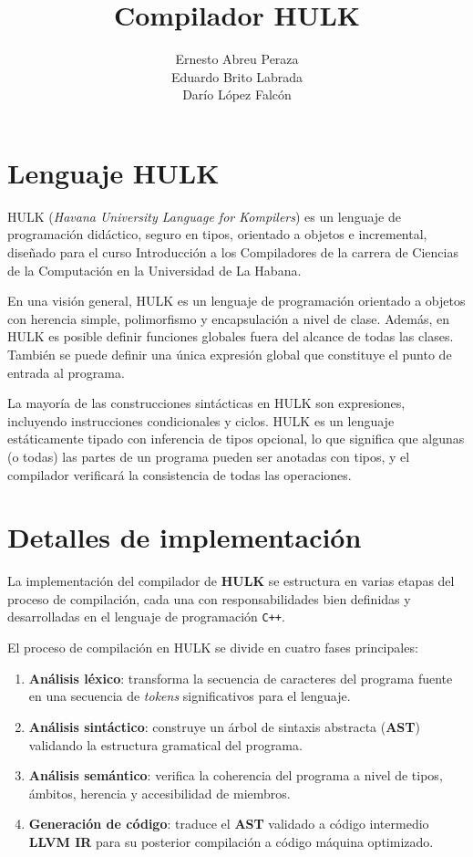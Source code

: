 \documentclass{article}
\title{Compilador HULK}
\author{Ernesto Abreu Peraza \\ Eduardo Brito Labrada \\ Darío López Falcón}
\date{}
\begin{document}
\maketitle 

\section{Lenguaje HULK}

HULK (\textit{Havana University Language for Kompilers}) es un lenguaje de programación didáctico, seguro en tipos, orientado a objetos e incremental, diseñado para el curso Introducción a los Compiladores de la carrera de Ciencias de la Computación en la Universidad de La Habana.

En una visión general, HULK es un lenguaje de programación orientado a objetos con herencia simple, polimorfismo y encapsulación a nivel de clase. Además, en HULK es posible definir funciones globales fuera del alcance de todas las clases. También se puede definir una única expresión global que constituye el punto de entrada al programa.

La mayoría de las construcciones sintácticas en HULK son expresiones, incluyendo instrucciones condicionales y ciclos. HULK es un lenguaje estáticamente tipado con inferencia de tipos opcional, lo que significa que algunas (o todas) las partes de un programa pueden ser anotadas con tipos, y el compilador verificará la consistencia de todas las operaciones.

\section{Detalles de implementación}

La implementación del compilador de \textbf{HULK} se estructura en varias etapas del proceso de compilación, cada una con responsabilidades bien definidas y desarrolladas en el lenguaje de programación \texttt{C++}. 

El proceso de compilación en HULK se divide en cuatro fases principales:

\begin{enumerate}
    \item \textbf{Análisis léxico}: transforma la secuencia de caracteres del programa fuente en una secuencia de \textit{tokens} significativos para el lenguaje.
    \item \textbf{Análisis sintáctico}: construye un árbol de sintaxis abstracta (\textbf{AST}) validando la estructura gramatical del programa.
    \item \textbf{Análisis semántico}: verifica la coherencia del programa a nivel de tipos, ámbitos, herencia y accesibilidad de miembros.
    \item \textbf{Generación de código}: traduce el \textbf{AST} validado a código intermedio \textbf{LLVM IR} para su posterior compilación a código máquina optimizado.
\end{enumerate}
\end{document}
